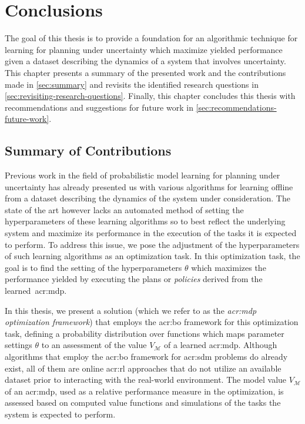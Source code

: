 \chapter{Conclusions}
\label{ch:conclusions}

The goal of this thesis is to provide a foundation for an algorithmic technique for learning  for planning under uncertainty which maximize yielded performance given a dataset describing the dynamics of a system that involves uncertainty.
This chapter presents a summary of the presented work and the contributions made in \autoref{sec:summary} and revisits the identified research questions in \autoref{sec:revisiting-research-questions}.
Finally, this chapter concludes this thesis with recommendations and suggestions for future work in \autoref{sec:recommendations-future-work}.

\section{Summary of Contributions}
\label{sec:summary}

Previous work in the field of probabilistic model learning for planning under uncertainty has already presented us with various algorithms for learning  offline from a dataset describing the dynamics of the system under consideration.
The state of the art however lacks an automated method of setting the hyperparameters of these learning algorithms so to best reflect the underlying system and maximize its performance in the execution of the tasks it is expected to perform.
To address this issue, we pose the adjustment of the hyperparameters of such learning algorithms as an optimization task.
In this optimization task, the goal is to find the setting of the hyperparameters $\theta$ which maximizes the performance yielded by executing the plans or \textit{policies} derived from the learned~\acrshort{acr:mdp}.

In this thesis, we present a solution (which we refer to as the \textit{\acrshort{acr:mdp} optimization framework}) that employs the \acrfull{acr:bo} framework for this optimization task, defining a probability distribution over functions which maps parameter settings $\theta$ to an assessment of the value $V_\mathcal{M}$ of a learned \acrshort{acr:mdp}.
Although algorithms that employ the \acrshort{acr:bo} framework for \acrshort{acr:sdm} problems do already exist, all of them are online \acrshort{acr:rl} approaches that do not utilize an available dataset prior to interacting with the real-world environment.
The model value $V_\mathcal{M}$ of an \acrshort{acr:mdp}, used as a relative performance measure in the optimization, is assessed based on computed value functions and simulations of the tasks the system is expected to perform.


